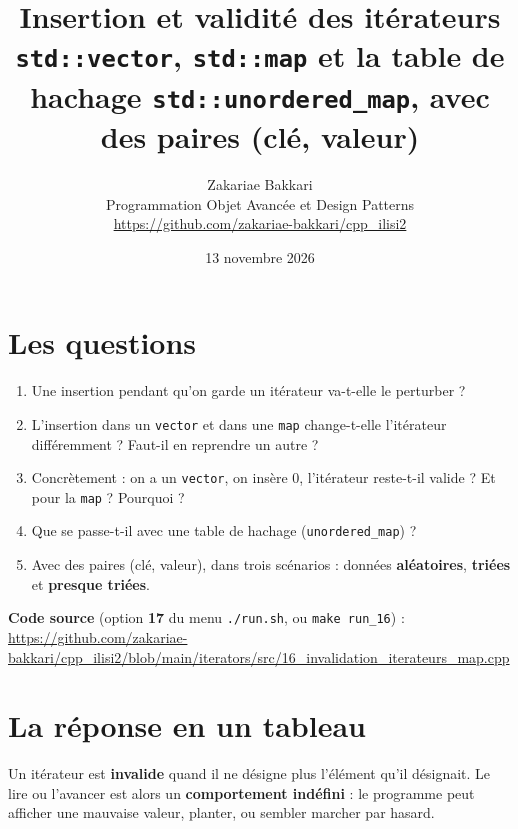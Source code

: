 \documentclass[11pt,a4paper]{article}
\title{\textbf{Insertion et validité des itérateurs}\\[4pt]
       \large \texttt{std::vector}, \texttt{std::map} et la table de hachage
       \texttt{std::unordered\_map}, avec des paires (clé, valeur)}
\author{Zakariae Bakkari\\
        \small Programmation Objet Avancée et Design Patterns\\
        \small\url{https://github.com/zakariae-bakkari/cpp_ilisi2}}
\date{13 novembre 2026}
\begin{document}
\maketitle

\section{Les questions}

\begin{enumerate}
  \item Une insertion pendant qu'on garde un itérateur va-t-elle le perturber ?
  \item L'insertion dans un \texttt{vector} et dans une \texttt{map} change-t-elle
        l'itérateur différemment ? Faut-il en reprendre un autre ?
  \item Concrètement : on a un \texttt{vector}, on insère 0, l'itérateur reste-t-il
        valide ? Et pour la \texttt{map} ? Pourquoi ?
  \item Que se passe-t-il avec une table de hachage (\texttt{unordered\_map}) ?
  \item Avec des paires (clé, valeur), dans trois scénarios : données
        \textbf{aléatoires}, \textbf{triées} et \textbf{presque triées}.
\end{enumerate}

\textbf{Code source} (option \textbf{17} du menu \texttt{./run.sh}, ou
\texttt{make run\_16}) :\\
{\scriptsize\url{https://github.com/zakariae-bakkari/cpp_ilisi2/blob/main/iterators/src/16_invalidation_iterateurs_map.cpp}}

\section{La réponse en un tableau}

Un itérateur est \textbf{invalide} quand il ne désigne plus l'élément qu'il désignait. Le
lire ou l'avancer est alors un \textbf{comportement indéfini} : le programme peut afficher
une mauvaise valeur, planter, ou sembler marcher par hasard.
\end{document}

